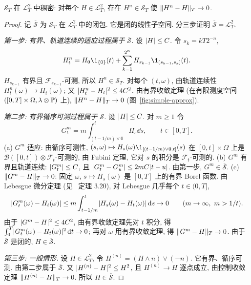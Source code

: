 \begin{lemma}[简单过程的稠密性]\label{lem:simple-dense}
$\mathscr{S}_T$ 在 $\mathscr{L}^2_T$ 中稠密: 对每个 $H\in\mathscr{L}^2_T$, 存在 $H^n\in\mathscr{S}_T$ 使 $\norm{H^n-H}_T\to0$.
\end{lemma}

\begin{proof}
记 $\overline{\mathscr{S}}$ 为 $\mathscr{S}_T$ 在 $\mathscr{L}^2_T$ 中的闭包. 它是闭的线性子空间. 分三步证明 $\overline{\mathscr{S}}=\mathscr{L}^2_T$.

\emph{第一步: 有界、轨道连续的适应过程属于 $\overline{\mathscr{S}}$.} 设 $\abs{H}\le C$. 令 $s_k=kT2^{-n}$,
\[
H^n_t=H_0\1_{\{0\}}(t)+\sum_{k=1}^{2^n}H_{s_{k-1}}\1_{(s_{k-1},s_k]}(t).
\]
$H_{s_{k-1}}$ 有界且 $\mathcal{F}_{s_{k-1}}$-可测, 所以 $H^n\in\mathscr{S}_T$. 对每个 $(t,\omega)$, 由轨道连续性 $H^n_t(\omega)\to H_t(\omega)$; 又 $\abs{H^n_t-H_t}^2\le4C^2$. 由有界收敛定理 (在有限测度空间 $([0,T]\times\Omega,\lambda\otimes\P)$ 上), $\norm{H^n-H}_T\to0$ (图~\ref{fig:simple-approx}).

\emph{第二步: 有界循序可测过程属于 $\overline{\mathscr{S}}$.} 设 $\abs{H}\le C$. 对 $m\ge1$ 令
\[
G^m_t=m\int_{(t-1/m)\vee0}^tH_s\dd s,\qquad t\in[0,T].
\]
(a) $G^m$ 适应: 由循序可测性, $(s,\omega)\mapsto H_s(\omega)\1_{[(t-1/m)\vee0,t]}(s)$ 在 $[0,t]\times\Omega$ 上是 $\mathcal{B}([0,t])\otimes\mathcal{F}_t$-可测的, 由 Fubini 定理, 它对 $s$ 的积分是 $\mathcal{F}_t$-可测的. (b) $G^m$ 有界且轨道连续: $\abs{G^m_t}\le C$, 且 $\abs{G^m_t-G^m_u}\le2mC\abs{t-u}$. 由第一步, $G^m\in\overline{\mathscr{S}}$. (c) $\norm{G^m-H}_T\to0$: 固定 $\omega$, $s\mapsto H_s(\omega)$ 是 $[0,T]$ 上的有界 Borel 函数. 由 Lebesgue 微分定理 (见~\cite{folland} 定理 3.20), 对 Lebesgue 几乎每个 $t\in(0,T]$,
\[
\abs{G^m_t(\omega)-H_t(\omega)}\le m\int_{t-1/m}^t\abs{H_s(\omega)-H_t(\omega)}\dd s\to0\qquad(m\to\infty,\ m>1/t).
\]
由于 $\abs{G^m-H}^2\le4C^2$, 由有界收敛定理先对 $t$ 积分, 得 $\int_0^T\abs{G^m_t(\omega)-H_t(\omega)}^2\dd t\to0$; 再对 $\omega$ 用有界收敛定理, 得 $\norm{G^m-H}_T\to0$. 由于 $\overline{\mathscr{S}}$ 是闭的, $H\in\overline{\mathscr{S}}$.

\emph{第三步: 一般情形.} 设 $H\in\mathscr{L}^2_T$, 令 $H^{(n)}=(H\wedge n)\vee(-n)$. 它有界、循序可测, 由第二步属于 $\overline{\mathscr{S}}$. 又 $\abs{H^{(n)}-H}^2\le H^2$, 且 $H^{(n)}\to H$ 逐点成立, 由控制收敛定理 $\norm{H^{(n)}-H}_T\to0$. 所以 $H\in\overline{\mathscr{S}}$.
\end{proof}

